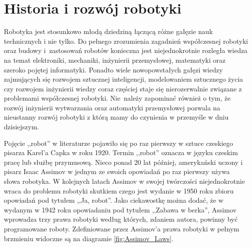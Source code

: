 \chapter{Historia i rozwój robotyki}
Robotyka jest stosunkowo młodą dziedziną łączącą różne gałęzie nauk technicznych
i nie tylko. Do pełnego zrozumienia zagadnień współczesnej robotyki oraz budowy
i~zastosowań robotów konieczna jest niejednokrotnie rozległa wiedza na
temat elektroniki, mechaniki, inżynierii przemysłowej, matematyki oraz szeroko pojętej
informatyki. Ponadto wiele nowopowstałych gałęzi wiedzy zajmujących się rozwojem
sztucznej inteligencji, modelowaniem sztucznego życia czy rozwojem inżynierii
wiedzy coraz częściej staje się nierozerwalnie związane z problemami współczesnej
robotyki. Nie~należy zapominać również o tym, że rozwój inżynierii wytwarzania
oraz automatyki przemysłowej pozwala na nieustanny rozwój robotyki z
którą mamy do czynienia w przemyśle w dniu dzisiejszym.

Pojęcie ,,robot'' w literaturze pojawiło się po raz pierwszy w sztuce czeskiego
pisarza Karel'a Capka w roku 1920. Termin ,,robot'' oznacza w języku czeskim
pracę lub służbę przymusową. Nieco ponad 20 lat później, amerykański uczony i
pisarz Isaac Assimov w jednym ze swoich opowiadań po raz pierwszy używa słowa
robotyka. W kolejnych latach Assimov w swojej twórczości niejednokrotnie wraca do
problemu robotyki skutkiem czego jest wydanie w 1950 roku zbioru opowiadań pod
tytułem ,,Ja, robot''. Jako ciekawostkę można dodać, że w wydanym w 1942 roku
opowiadaniu pod tytułem ,,Zabawa w berka'', Assimov wprowadza trzy prawa
robotyki według których, zdaniem autora, powinny być programowane
roboty\cite{Runaround}. Zdefiniowane przez Assimov'a prawa robotyki w pełnym
brzmieniu widoczne są na diagramie \ref{fig:Assimov_Laws}.

